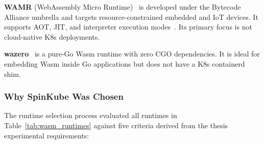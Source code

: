 \textbf{WAMR} (WebAssembly Micro Runtime)~\cite{bytecodealliance2024wamr} is developed under the Bytecode Alliance umbrella and targets resource-constrained embedded and IoT devices. It supports \acs{AOT}, \acs{JIT}, and interpreter execution modes~\cite{bytecodealliance2024wamr}. Its primary focus is not cloud-native \acs{K8s} deployments.

\textbf{wazero}~\cite{wazero2024} is a pure-Go \acs{Wasm} runtime with zero \acs{CGO} dependencies. It is ideal for embedding \acs{Wasm} inside Go applications but does not have a \acs{K8s} containerd shim.

\subsubsection{Why SpinKube Was Chosen}

The runtime selection process evaluated all runtimes in Table~\ref{tab:wasm_runtimes} against five criteria derived from the thesis experimental requirements:

